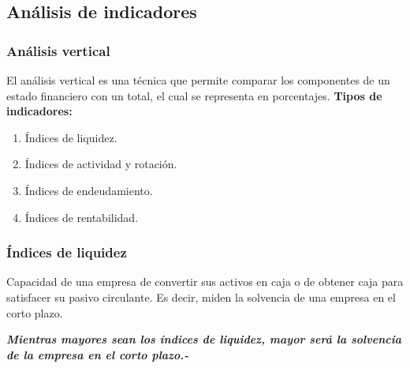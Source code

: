 \documentclass{templateNote}
\begin{document}
\subsection{Análisis de indicadores}
\subsubsection{Análisis vertical}
\noindent El análisis vertical es una técnica que permite comparar los componentes de un estado financiero con un total, el cual se representa en porcentajes.
\textbf{Tipos de indicadores:}
\begin{enumerate}
    \item Índices de liquidez.
    \item Índices de actividad y rotación.
    \item Índices de endeudamiento.
    \item Índices de rentabilidad.
\end{enumerate}

\subsubsection{Índices de liquidez}
\noindent Capacidad de una empresa de convertir sus activos en caja o de obtener caja para satisfacer su pasivo circulante. Es decir, miden la solvencia de una empresa en el corto plazo.

\begin{tcolorbox}[colback=orange!10!white,colframe=orange!60!black,title=Observación]
    \textit{\textbf{Mientras mayores sean los índices de liquidez, mayor será la solvencia de la empresa en el corto plazo.-}}
\end{tcolorbox}
\end{document}
